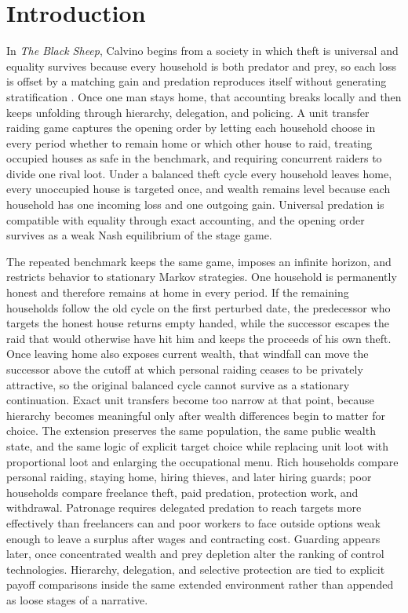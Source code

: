 \section{Introduction}

In \emph{The Black Sheep}, Calvino begins from a society in which theft is universal and equality survives because every household is both predator and prey, so each loss is offset by a matching gain and predation reproduces itself without generating stratification \citep{calvino_1993}. Once one man stays home, that accounting breaks locally and then keeps unfolding through hierarchy, delegation, and policing. A unit transfer raiding game captures the opening order by letting each household choose in every period whether to remain home or which other house to raid, treating occupied houses as safe in the benchmark, and requiring concurrent raiders to divide one rival loot. Under a balanced theft cycle every household leaves home, every unoccupied house is targeted once, and wealth remains level because each household has one incoming loss and one outgoing gain. Universal predation is compatible with equality through exact accounting, and the opening order survives as a weak Nash equilibrium of the stage game.

The repeated benchmark keeps the same game, imposes an infinite horizon, and restricts behavior to stationary Markov strategies. One household is permanently honest and therefore remains at home in every period. If the remaining households follow the old cycle on the first perturbed date, the predecessor who targets the honest house returns empty handed, while the successor escapes the raid that would otherwise have hit him and keeps the proceeds of his own theft. Once leaving home also exposes current wealth, that windfall can move the successor above the cutoff at which personal raiding ceases to be privately attractive, so the original balanced cycle cannot survive as a stationary continuation. Exact unit transfers become too narrow at that point, because hierarchy becomes meaningful only after wealth differences begin to matter for choice. The extension preserves the same population, the same public wealth state, and the same logic of explicit target choice while replacing unit loot with proportional loot and enlarging the occupational menu. Rich households compare personal raiding, staying home, hiring thieves, and later hiring guards; poor households compare freelance theft, paid predation, protection work, and withdrawal. Patronage requires delegated predation to reach targets more effectively than freelancers can and poor workers to face outside options weak enough to leave a surplus after wages and contracting cost. Guarding appears later, once concentrated wealth and prey depletion alter the ranking of control technologies. Hierarchy, delegation, and selective protection are tied to explicit payoff comparisons inside the same extended environment rather than appended as loose stages of a narrative.

